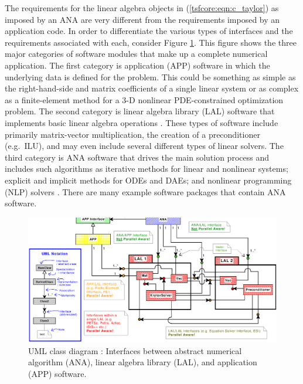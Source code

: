 The requirements for the linear algebra objects in
(\ref{tsfcore:eqn:c_taylor}) as imposed by
an ANA are very different from the requirements imposed by an
application code.  In order to differentiate the various types of
interfaces and the requirements associated with each, consider Figure
\ref{tsfcore:fig:ANA_LAL_APP}.  This figure shows the three major
categories of software modules that make up a complete numerical
application.  The first category is application (APP) software in
which the underlying data is defined for the problem.  This could be
something as simple as the right-hand-side and matrix coefficients of
a single linear system or as complex as a finite-element method for a
3-D nonlinear PDE-constrained optimization problem.  The second
category is linear algebra library (LAL) software that implements
basic linear algebra operations \cite{ref:demmel_1997,
ref:anderson_1995, ref:blackford_et_al_1997, ref:aztec, ref:petsc,
ref:trilinos}. These types of software include primarily matrix-vector
multiplication, the creation of a preconditioner (e.g.~ILU), and may
even include several different types of linear solvers.  The third
category is ANA software that drives the main solution process and
includes such algorithms as iterative methods for linear and nonlinear
systems; explicit and implicit methods for ODEs and DAEs; and
nonlinear programming (NLP) solvers \cite{ref:nocedal_wright_1999}.
There are many example software packages
\cite{ref:petsc,ref:aztec,ref:trilinos,ref:pvode,ref:tao} that contain
ANA software.

{\bsinglespace
\begin{figure}[t]
\begin{center}
\includegraphics*[bb= 0.245in 2.95in 10.85in 8.60in,angle=0,scale=0.50
]{analal}
\end{center}
\caption{
\label{tsfcore:fig:ANA_LAL_APP}
UML \cite{ref:booch_et_al_1999} class diagram : Interfaces between abstract numerical algorithm
(ANA), linear algebra library (LAL), and application (APP) software.
}
\end{figure}
\esinglespace}

